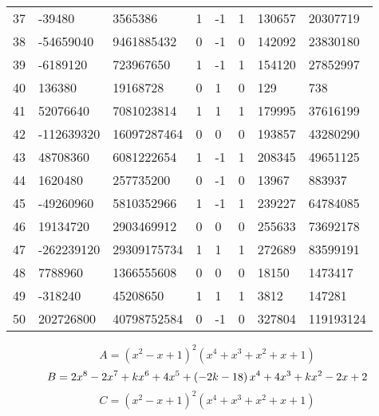 \documentclass{amsart}
\begin{document}
\begin{longtable}{|l|l|l|lllll|}
37&-39480&3565386&1&-1&1&130657&20307719\\
38&-54659040&9461885432&0&-1&0&142092&23830180\\
39&-6189120&723967650&1&-1&1&154120&27852997\\
40&136380&19168728&0&1&0&129&738\\
41&52076640&7081023814&1&1&1&179995&37616199\\
42&-112639320&16097287464&0&0&0&193857&43280290\\
43&48708360&6081222654&1&-1&1&208345&49651125\\
44&1620480&257735200&0&-1&0&13967&883937\\
45&-49260960&5810352966&1&-1&1&239227&64784085\\
46&19134720&2903469912&0&0&0&255633&73692178\\
47&-262239120&29309175734&1&1&1&272689&83599191\\
48&7788960&1366555608&0&0&0&18150&1473417\\
49&-318240&45208650&1&1&1&3812&147281\\
50&202726800&40798752584&0&-1&0&327804&119193124\\
\hline
\end{longtable}
$$A=(x^2
 - x
 + 1)^{2}(x^4
 + x^3
 + x^2
 + x
 + 1)$$
$$B=2\*x^8
 - 2\*x^7
 + k\*x^6
 + 4\*x^5
 + \left(-2\*k
 - 18\right) \*x^4
 + 4\*x^3
 + k\*x^2
 - 2\*x
 + 2$$
$$C=(x^2
 - x
 + 1)^{2}(x^4
 + x^3
 + x^2
 + x
 + 1)$$
\end{document}
